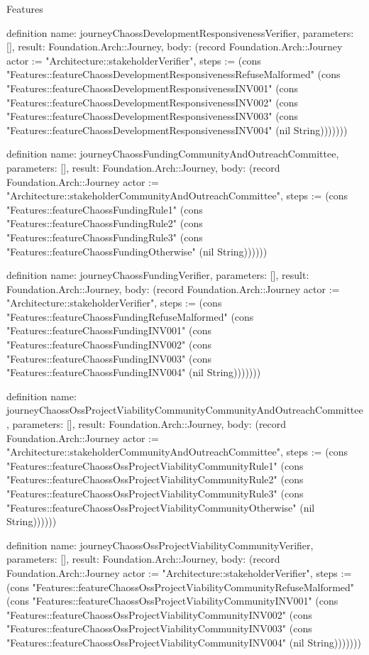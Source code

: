 \begin{lexlean}{Features}
\begin{semanticmodule}
definition{
  name: journeyChaossDevelopmentResponsivenessVerifier,
  parameters: [],
  result: Foundation.Arch::Journey,
  body: (record Foundation.Arch::Journey {actor := "Architecture::stakeholderVerifier", steps := (cons "Features::featureChaossDevelopmentResponsivenessRefuseMalformed" (cons "Features::featureChaossDevelopmentResponsivenessINV001" (cons "Features::featureChaossDevelopmentResponsivenessINV002" (cons "Features::featureChaossDevelopmentResponsivenessINV003" (cons "Features::featureChaossDevelopmentResponsivenessINV004" (nil String))))))})
}

definition{
  name: journeyChaossFundingCommunityAndOutreachCommittee,
  parameters: [],
  result: Foundation.Arch::Journey,
  body: (record Foundation.Arch::Journey {actor := "Architecture::stakeholderCommunityAndOutreachCommittee", steps := (cons "Features::featureChaossFundingRule1" (cons "Features::featureChaossFundingRule2" (cons "Features::featureChaossFundingRule3" (cons "Features::featureChaossFundingOtherwise" (nil String)))))})
}

definition{
  name: journeyChaossFundingVerifier,
  parameters: [],
  result: Foundation.Arch::Journey,
  body: (record Foundation.Arch::Journey {actor := "Architecture::stakeholderVerifier", steps := (cons "Features::featureChaossFundingRefuseMalformed" (cons "Features::featureChaossFundingINV001" (cons "Features::featureChaossFundingINV002" (cons "Features::featureChaossFundingINV003" (cons "Features::featureChaossFundingINV004" (nil String))))))})
}

definition{
  name: journeyChaossOssProjectViabilityCommunityCommunityAndOutreachCommittee,
  parameters: [],
  result: Foundation.Arch::Journey,
  body: (record Foundation.Arch::Journey {actor := "Architecture::stakeholderCommunityAndOutreachCommittee", steps := (cons "Features::featureChaossOssProjectViabilityCommunityRule1" (cons "Features::featureChaossOssProjectViabilityCommunityRule2" (cons "Features::featureChaossOssProjectViabilityCommunityRule3" (cons "Features::featureChaossOssProjectViabilityCommunityOtherwise" (nil String)))))})
}

definition{
  name: journeyChaossOssProjectViabilityCommunityVerifier,
  parameters: [],
  result: Foundation.Arch::Journey,
  body: (record Foundation.Arch::Journey {actor := "Architecture::stakeholderVerifier", steps := (cons "Features::featureChaossOssProjectViabilityCommunityRefuseMalformed" (cons "Features::featureChaossOssProjectViabilityCommunityINV001" (cons "Features::featureChaossOssProjectViabilityCommunityINV002" (cons "Features::featureChaossOssProjectViabilityCommunityINV003" (cons "Features::featureChaossOssProjectViabilityCommunityINV004" (nil String))))))})
}


\end{semanticmodule}
\end{lexlean}
